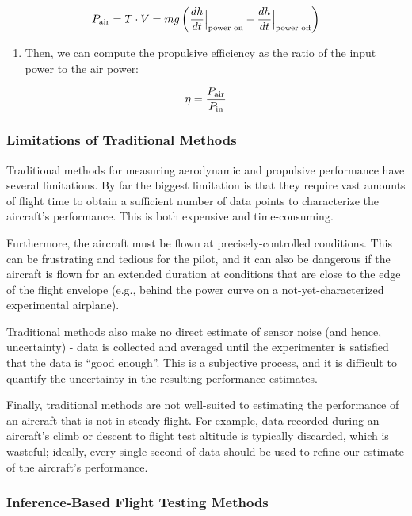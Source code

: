 \documentclass[11pt]{article}
\providecommand{\tightlist}{%
      \setlength{\itemsep}{0pt}\setlength{\parskip}{0pt}}
\begin{document}
\[P_{\rm air}=T \cdot V = m g \left( \frac{dh}{dt}\Big |_\text{power on} - \frac{dh}{dt}\Big |_\text{power off} \right)\]

\begin{enumerate}
\def\labelenumi{\arabic{enumi}.}
\setcounter{enumi}{2}
\tightlist
\item
  Then, we can compute the propulsive efficiency as the ratio of the
  input power to the air power:
\end{enumerate}

\[\eta = \frac{P_{\rm air}}{P_{\rm in}}\]

    \hypertarget{limitations-of-traditional-methods}{%
\subsubsection{Limitations of Traditional
Methods}\label{limitations-of-traditional-methods}}

Traditional methods for measuring aerodynamic and propulsive performance
have several limitations. By far the biggest limitation is that they
require vast amounts of flight time to obtain a sufficient number of
data points to characterize the aircraft's performance. This is both
expensive and time-consuming.

Furthermore, the aircraft must be flown at precisely-controlled
conditions. This can be frustrating and tedious for the pilot, and it
can also be dangerous if the aircraft is flown for an extended duration
at conditions that are close to the edge of the flight envelope (e.g.,
behind the power curve on a not-yet-characterized experimental
airplane).

Traditional methods also make no direct estimate of sensor noise (and
hence, uncertainty) - data is collected and averaged until the
experimenter is satisfied that the data is ``good enough''. This is a
subjective process, and it is difficult to quantify the uncertainty in
the resulting performance estimates.

Finally, traditional methods are not well-suited to estimating the
performance of an aircraft that is not in steady flight. For example,
data recorded during an aircraft's climb or descent to flight test
altitude is typically discarded, which is wasteful; ideally, every
single second of data should be used to refine our estimate of the
aircraft's performance.

    \hypertarget{inference-based-flight-testing-methods}{%
\subsubsection{Inference-Based Flight Testing
Methods}\label{inference-based-flight-testing-methods}}
\end{document}
